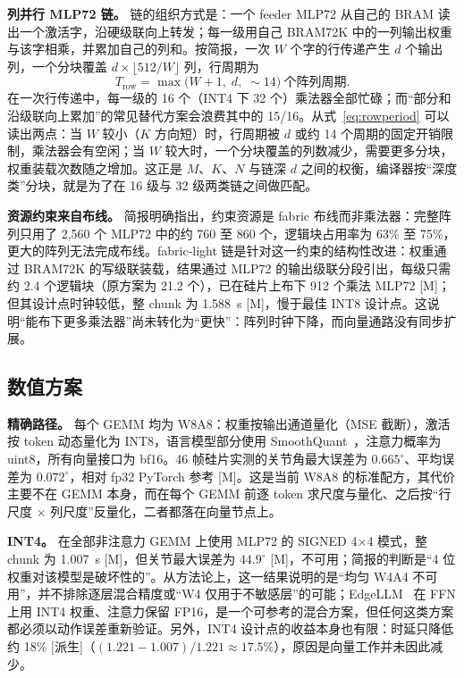 \documentclass[a4paper,10.5pt]{ctexart}
\newcommand{\tM}{\textsf{[M]}}              %
\newcommand{\tD}{\textsf{[派生]}}           %
\begin{document}
\textbf{列并行 MLP72 链。} 链的组织方式是：一个 feeder MLP72 从自己的 BRAM 读出一个激活字，沿硬级联向上转发；每一级用自己 BRAM72K 中的一列输出权重与该字相乘，并累加自己的列和。按简报，一次 $W$ 个字的行传递产生 $d$ 个输出列，一个分块覆盖 $d\times\lfloor512/W\rfloor$ 列，行周期为
\begin{equation}
  T_{\text{row}} = \max\bigl(W+1,\; d,\; \sim\!14\bigr)\ \text{个阵列周期}.
  \label{eq:rowperiod}
\end{equation}
在一次行传递中，每一级的 16 个（INT4 下 32 个）乘法器全部忙碌；而“部分和沿级联向上累加”的常见替代方案会浪费其中的 15/16。从式~\eqref{eq:rowperiod} 可以读出两点：当 $W$ 较小（$K$ 方向短）时，行周期被 $d$ 或约 14 个周期的固定开销限制，乘法器会有空闲；当 $W$ 较大时，一个分块覆盖的列数减少，需要更多分块，权重装载次数随之增加。这正是 $M$、$K$、$N$ 与链深 $d$ 之间的权衡，编译器按“深度类”分块，就是为了在 16 级与 32 级两类链之间做匹配。

\textbf{资源约束来自布线。} 简报明确指出，约束资源是 fabric 布线而非乘法器：完整阵列只用了 2,560 个 MLP72 中的约 760 至 860 个，逻辑块占用率为 63\% 至 75\%，更大的阵列无法完成布线。fabric-light 链是针对这一约束的结构性改进：权重通过 BRAM72K 的写级联装载，结果通过 MLP72 的输出级联分段引出，每级只需约 2.4 个逻辑块（原方案为 21.2 个），已在硅片上布下 912 个乘法 MLP72 \tM；但其设计点时钟较低，整 chunk 为 1.588~s \tM，慢于最佳 INT8 设计点。这说明“能布下更多乘法器”尚未转化为“更快”：阵列时钟下降，而向量通路没有同步扩展。

\subsection{数值方案}

\textbf{精确路径。} 每个 GEMM 均为 W8A8：权重按输出通道量化（MSE 截断），激活按 token 动态量化为 INT8，语言模型部分使用 SmoothQuant~\cite{smoothquant}，注意力概率为 uint8，所有向量接口为 bf16。46 帧硅片实测的关节角最大误差为 $0.665^\circ$、平均误差为 $0.072^\circ$，相对 fp32 PyTorch 参考 \tM。这是当前 W8A8 的标准配方，其代价主要不在 GEMM 本身，而在每个 GEMM 前逐 token 求尺度与量化、之后按“行尺度 $\times$ 列尺度”反量化，二者都落在向量节点上。

\textbf{INT4。} 在全部非注意力 GEMM 上使用 MLP72 的 SIGNED 4$\times$4 模式，整 chunk 为 1.007~s \tM，但关节最大误差为 $44.9^\circ$ \tM，不可用；简报的判断是“4 位权重对该模型是破坏性的”。从方法论上，这一结果说明的是“均匀 W4A4 不可用”，并不排除逐层混合精度或“W4 仅用于不敏感层”的可能；EdgeLLM~\cite{edgellm} 在 FFN 上用 INT4 权重、注意力保留 FP16，是一个可参考的混合方案，但任何这类方案都必须以动作误差重新验证。另外，INT4 设计点的收益本身也有限：时延只降低约 18\% \tD（$(1.221-1.007)/1.221\approx17.5\%$），原因是向量工作并未因此减少。
\end{document}
